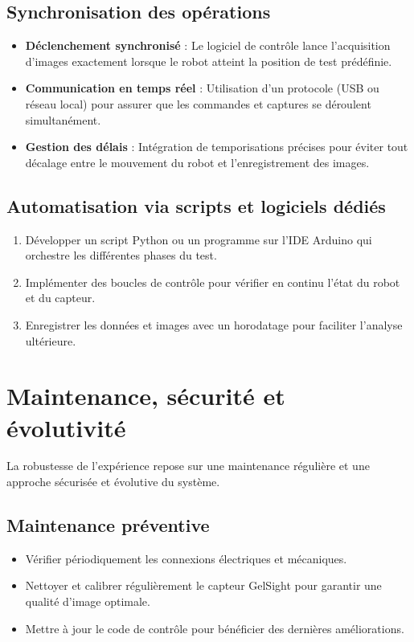 \documentclass[a4paper,12pt]{article}
\begin{document}
\subsection{Synchronisation des opérations}
\begin{itemize}
    \item \textbf{Déclenchement synchronisé} : Le logiciel de contrôle lance l'acquisition d'images exactement lorsque le robot atteint la position de test prédéfinie.
    \item \textbf{Communication en temps réel} : Utilisation d'un protocole (USB ou réseau local) pour assurer que les commandes et captures se déroulent simultanément.
    \item \textbf{Gestion des délais} : Intégration de temporisations précises pour éviter tout décalage entre le mouvement du robot et l'enregistrement des images.
\end{itemize}

\subsection{Automatisation via scripts et logiciels dédiés}
\begin{enumerate}
    \item Développer un script Python ou un programme sur l'IDE Arduino qui orchestre les différentes phases du test.
    \item Implémenter des boucles de contrôle pour vérifier en continu l'état du robot et du capteur.
    \item Enregistrer les données et images avec un horodatage pour faciliter l'analyse ultérieure.
\end{enumerate}

\section{Maintenance, sécurité et évolutivité}
La robustesse de l'expérience repose sur une maintenance régulière et une approche sécurisée et évolutive du système.

\subsection{Maintenance préventive}
\begin{itemize}
    \item Vérifier périodiquement les connexions électriques et mécaniques.
    \item Nettoyer et calibrer régulièrement le capteur GelSight pour garantir une qualité d'image optimale.
    \item Mettre à jour le code de contrôle pour bénéficier des dernières améliorations.
\end{itemize}
\end{document}
